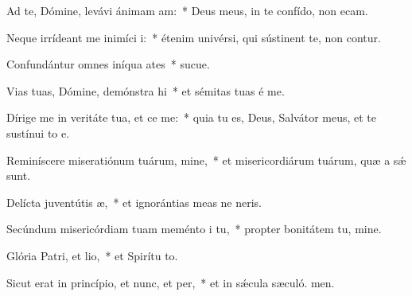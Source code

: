 \item Ad te, Dómine, levávi ánimam am:~* Deus meus, in te confído, non ecam.
\item Neque irrídeant me inimíci i:~* étenim univérsi, qui sústinent te, non contur.
\item Confundántur omnes iníqua ates~* sucue.
\item Vias tuas, Dómine, demónstra hi~* et sémitas tuas é me.
\item Dírige me in veritáte tua, et ce me:~* quia tu es, Deus, Salvátor meus, et te sustínui to e.
\item Reminíscere miseratiónum tuárum, mine,~* et misericordiárum tuárum, quæ a sǽ sunt.
\item Delícta juventútis æ,~* et ignorántias meas ne neris.
\item Secúndum misericórdiam tuam meménto i tu,~* propter bonitátem tu, mine.
\item Glória Patri, et lio,~* et Spirítu to.
\item Sicut erat in princípio, et nunc, et per,~* et in sǽcula sæculó. men.
